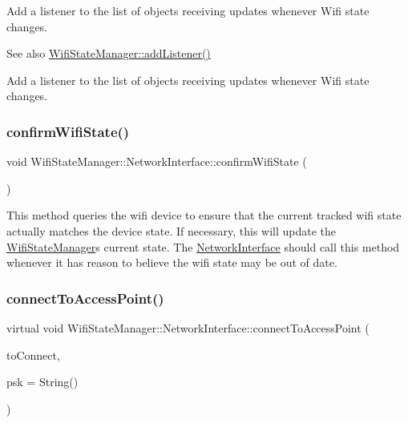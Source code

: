 Add a listener to the list of objects receiving updates whenever Wifi state changes. ~\newline
\begin{DoxySeeAlso}{See also}
\mbox{\hyperlink{classWifiStateManager_ac4262cfae2045cef25443fd8dddcd1b3}{Wifi\+State\+Manager\+::add\+Listener()}}
\end{DoxySeeAlso}
Add a listener to the list of objects receiving updates whenever Wifi state changes. \mbox{\label{classWifiStateManager_1_1NetworkInterface_a0d4037e930a96b9458486f619725b480}} 
\subsubsection{\texorpdfstring{confirm\+Wifi\+State()}{confirmWifiState()}}
{\footnotesize\ttfamily void Wifi\+State\+Manager\+::\+Network\+Interface\+::confirm\+Wifi\+State (\begin{DoxyParamCaption}{ }\end{DoxyParamCaption})\hspace{0.3cm}{\ttfamily [protected]}}

This method queries the wifi device to ensure that the current tracked wifi state actually matches the device state. If necessary, this will update the \mbox{\hyperlink{classWifiStateManager}{Wifi\+State\+Manager}}\textquotesingle{}s current state. The \mbox{\hyperlink{classWifiStateManager_1_1NetworkInterface}{Network\+Interface}} should call this method whenever it has reason to believe the wifi state may be out of date. \mbox{\label{classWifiStateManager_1_1NetworkInterface_a5c8a6cb7df8aaf53a0ebdf56aefc5080}} 
\subsubsection{\texorpdfstring{connect\+To\+Access\+Point()}{connectToAccessPoint()}}
{\footnotesize\ttfamily virtual void Wifi\+State\+Manager\+::\+Network\+Interface\+::connect\+To\+Access\+Point (\begin{DoxyParamCaption}\item[{\mbox{\hyperlink{classWifiAccessPoint_ad18977f884076774803027efbaa131a0}{Wifi\+Access\+Point\+::\+Ptr}}}]{to\+Connect,  }\item[{String}]{psk = {\ttfamily String()} }\end{DoxyParamCaption})\hspace{0.3cm}{\ttfamily [pure virtual]}}

